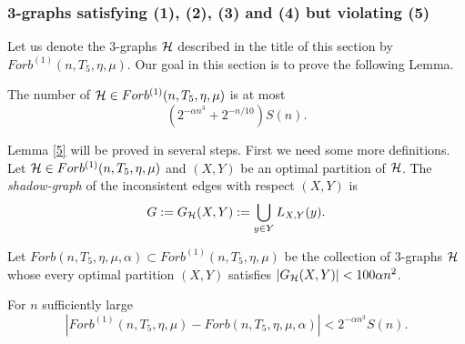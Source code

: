 \documentclass[11pt]{article}
\begin{document}
\subsubsection{3-graphs  satisfying (1), (2), (3) and (4) but violating
(5)}
Let us denote the 3-graphs $\mathcal{H}$ described in the title of this section by $Forb^{(1)}(n,T_5,\eta,\mu)$.
Our goal in  this section is to prove the following Lemma.

\begin{lemma} \label{5}
The number of  $\mathcal{H} \in Forb^{(1)}(n,T_5,\eta,\mu)$
is at most
$$(2^{-\alpha n^3}+2^{-n/10})S(n).$$
\end{lemma}

Lemma \ref{5} will be proved in several steps. First we need some
more definitions. Let $\mathcal{H}\in Forb^{(1)}(n,T_5,\eta,\mu)$ and
$(X,Y)$ be an optimal partition of $\mathcal{H}$. The {\it shadow-graph} of
the inconsistent edges with respect $(X,Y)$ is
$$G:=G_{\mathcal{H}}(X,Y):=\bigcup_{y\in Y} L_{X,Y}(y).$$

Let $Forb(n,T_5,\eta,\mu,\alpha)\subset Forb^{(1)}(n,T_5,\eta,\mu)$
 be the collection of 3-graphs $\mathcal{H}$  whose every optimal
partition $(X,Y)$ satisfies  $|G_{\mathcal{H}}(X,Y)|<  100\alpha n^2$.

\begin{lemma}\label{clean2}
For $n$ sufficiently large
\begin{equation}\label{clean3} |Forb^{(1)}(n,T_5,\eta,\mu)- Forb(n,T_5,\eta,\mu,\alpha)| <
 2^{-\alpha n^3}S(n).\end{equation}
\end{lemma}
\end{document}

